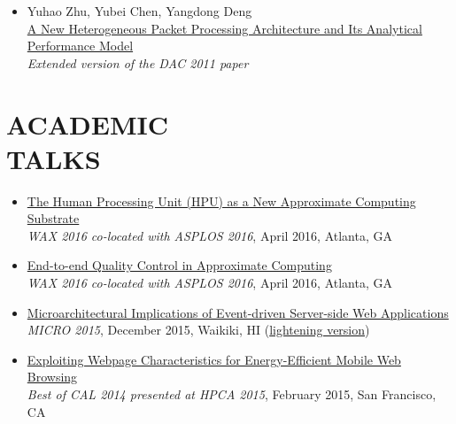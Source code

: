\documentclass[margin, 9pt]{res} %
\begin{document}
\begin{resume}
\begin{itemize}[leftmargin=*]
	\item Yuhao Zhu, Yubei Chen, Yangdong Deng\\
          \href{http://yuhaozhu.com/pubs/tr12.pdf}{A New Heterogeneous Packet Processing Architecture and Its Analytical Performance Model}\\
          \textit{Extended version of the DAC 2011 paper}
\end{itemize}

 
\section{ACADEMIC\\ TALKS}

\vspace*{-2pt}
\begin{itemize}[leftmargin=*] \itemsep 0pt
	\item \href{https://speakerdeck.com/queeten/the-human-processing-unit-hpu-as-a-new-approximate-computing-substrate}{The Human Processing Unit (HPU) as a New Approximate Computing Substrate}\\[2pt]
          \textit{WAX 2016 co-located with ASPLOS 2016}, April 2016, Atlanta, GA

	\item \href{https://speakerdeck.com/queeten/end-to-end-quality-control-in-approximate-computing}{End-to-end Quality Control in Approximate Computing}\\[2pt]
          \textit{WAX 2016 co-located with ASPLOS 2016}, April 2016, Atlanta, GA

	\item \href{https://speakerdeck.com/queeten/microarchitectural-implications-of-event-driven-server-side-web-applications}{Microarchitectural Implications of Event-driven Server-side Web Applications}\\[2pt]
          \textit{MICRO 2015}, December 2015, Waikiki, HI (\href{https://speakerdeck.com/queeten/micro-2015-lightning-session-talk}{lightening version})

	\item \href{https://speakerdeck.com/queeten/exploiting-webpage-characteristics-for-energy-efficient-mobile-web-browsing}{Exploiting Webpage Characteristics for Energy-Efficient Mobile Web Browsing}\\[2pt]
          \textit{Best of CAL 2014 presented at HPCA 2015}, February 2015, San Francisco, CA


\end{itemize}
\end{resume}
\end{document}
